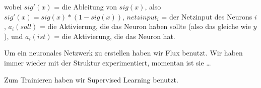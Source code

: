 \documentclass{scrartcl}
\begin{document}
	wobei $sig'(x)$ = die Ableitung von $sig(x)$, also $sig'(x) = sig(x) * (1 - sig(x))$, $netzinput_i$ = der Netzinput des Neurons $i$ , $a_i(soll)$ = die Aktivierung, die das Neuron haben sollte (also das gleiche wie $y$), und $a_i(ist)$ = die Aktivierung, die das Neuron hat. 





	

	Um ein neuronales Netzwerk zu erstellen haben wir Flux benutzt. Wir haben immer wieder mit der Struktur experimentiert, momentan ist sie … 

	

	Zum Trainieren haben wir Supervised Learning benutzt. 
\end{document}
